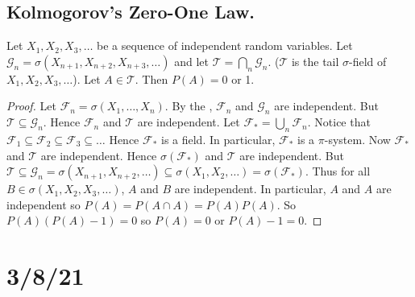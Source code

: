 \documentclass{article}
\newcommand{\F}{\mathscr{F}}
\theoremstyle{definition}
\begin{document}
\subsection*{Kolmogorov's Zero-One Law.}
Let $X_1, X_2, X_3, \dots$ be a sequence of independent random variables. Let $\mathscr{G}_n = \sigma(X_{n+1}, X_{n+2}, X_{n+3}, \dots)$ and let $\mathscr{T} = \bigcap_n \mathscr{G}_n$. ($\mathscr{T}$ is the tail $\sigma$-field of $X_1, X_2, X_3, \dots$). Let $A \in \mathscr{T}$. Then $P(A) = 0$ or 1.

\begin{proof}
    Let $\F_n = \sigma(X_1, \dots, X_n)$. By the , $\F_n$ and $\mathscr{G}_n$ are independent. But $\mathscr{T} \subseteq \mathscr{G}_n$. Hence $\mathscr{F}_n$ and $\mathscr{T}$ are independent. Let $\mathscr{F}_* = \bigcup_n \mathscr{F}_n$. Notice that $\mathscr{F}_1 \subseteq \mathscr{F}_2 \subseteq \mathscr{F}_3 \subseteq \dots$ Hence $\mathscr{F}_*$ is a field. In particular, $\mathscr{F}_*$ is a $\pi$-system.
    Now $\mathscr{F}_*$ and $\mathscr{T}$ are independent. Hence $\sigma(\mathscr{F}_*)$ and $\mathscr{T}$ are independent. But $\mathscr{T} \subseteq \mathscr{G}_n = \sigma(X_{n+1}, X_{n+2}, \dots) \subseteq \sigma(X_1, X_2, \dots) = \sigma(\mathscr{F}_*)$. Thus for all $B \in \sigma(X_1, X_2, X_3, \dots)$, $A$ and $B$ are independent. In particular, $A$ and $A$ are independent so $P(A) = P(A \cap A) = P(A)P(A)$. So $P(A)(P(A)-1) = 0$ so $P(A) = 0$ or $P(A)-1 = 0$.
\end{proof}

\section*{3/8/21}
\end{document}

